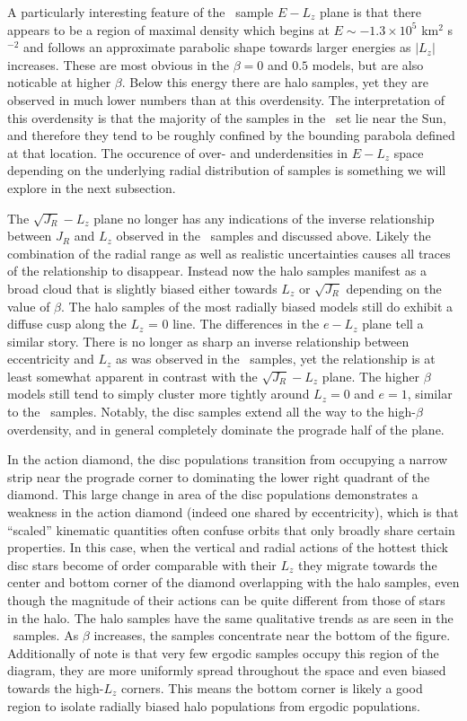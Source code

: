 A particularly interesting feature of the \survey\ sample $E-L_{z}$ plane is that there appears to be a region of maximal density which begins at $E \sim -1.3\times10^{5}$ km$^{2}$ s$^{-2}$ and follows an approximate parabolic shape towards larger energies as $\lvert L_{z} \rvert$ increases. These are most obvious in the $\beta=0$ and $0.5$ models, but are also noticable at higher $\beta$. Below this energy there are halo samples, yet they are observed in much lower numbers than at this overdensity. The interpretation of this overdensity is that the majority of the samples in the \survey\ set lie near the Sun, and therefore they tend to be roughly confined by the bounding parabola defined at that location. The occurence of over- and underdensities in $E-L_{z}$ space depending on the underlying radial distribution of samples is something we will explore in the next subsection.

The $\sqrt{J_{R}}-L_{z}$ plane no longer has any indications of the inverse relationship between $J_{R}$ and $L_{z}$ observed in the \solar\ samples and discussed above. Likely the combination of the radial range as well as realistic uncertainties causes all traces of the relationship to disappear. Instead now the halo samples manifest as a broad cloud that is slightly biased either towards $L_{z}$ or $\sqrt{J_{R}}$ depending on the value of $\beta$. The halo samples of the most radially biased models still do exhibit a diffuse cusp along the $L_{z}$ = 0 line. The differences in the $e-L_{z}$ plane tell a similar story. There is no longer as sharp an inverse relationship between eccentricity and $L_{z}$ as was observed in the \solar\ samples, yet the relationship is at least somewhat apparent in contrast with the $\sqrt{J_{R}}-L_{z}$ plane. The higher $\beta$ models still tend to simply cluster more tightly around $L_{z}=0$ and $e=1$, similar to the \solar\ samples. Notably, the disc samples extend all the way to the high-$\beta$ overdensity, and in general completely dominate the prograde half of the plane.

In the action diamond, the disc populations transition from occupying a narrow strip near the prograde corner to dominating the lower right quadrant of the diamond. This large change in area of the disc populations demonstrates a weakness in the action diamond (indeed one shared by eccentricity), which is that ``scaled'' kinematic quantities often confuse orbits that only broadly share certain properties. In this case, when the vertical and radial actions of the hottest thick disc stars become of order comparable with their $L_{z}$ they migrate towards the center and bottom corner of the diamond overlapping with the halo samples, even though the magnitude of their actions can be quite different from those of stars in the halo. The halo samples have the same qualitative trends as are seen in the \solar\ samples. As $\beta$ increases, the samples concentrate near the bottom of the figure. Additionally of note is that very few ergodic samples occupy this region of the diagram, they are more uniformly spread throughout the space and even biased towards the high-$L_{z}$ corners. This means the bottom corner is likely a good region to isolate radially biased halo populations from ergodic populations.

